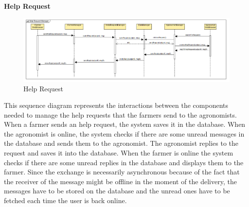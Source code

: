 \documentclass[table, 12pt]{article}
\begin{document}
\newpage
\textbf{Help Request}
\begin{center}
    \begin{figure}[H]
        \includegraphics[scale=0.55, center]{assets/SequenceDiagram/HelpRequestManager.png}
        \caption{Help Request}
        \label{fig: helpRequest}
    \end{figure}
\end{center}
This sequence diagram represents the interactions between the components needed to manage the help requests that the farmers send to the agronomists.
When a farmer sends an help request, the system saves it in the database.
When the agronomist is online, the system checks if there are some unread messages in the database and sends them to the agronomist.
The agronomist replies to the request and saves it into the database. 
When the farmer is online the system checks if there are some unread replies in the database and displays them to the farmer.
Since the exchange is necessarily asynchronous because of the fact that the receiver of the message might be offline in the moment of the delivery, the messages have to be stored on the database and the unread ones have to be fetched each time the user is back online.
\end{document}
